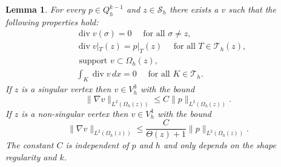 \documentclass[11pt]{amsart}
\numberwithin{equation}{section}
\newcommand{\Sh}{\mathcal{S}_h}
\newcommand{\dive}{\operatorname{div}}
\newcommand{\Th}{\mathcal{T}_h}
\newtheorem{lemma}{Lemma}
\theoremstyle{definition}
\begin{document}
\begin{lemma}\label{lemma0}
For every $p \in Q_h^{k-1}$ and $z \in \Sh$ there exists  a $v$ such that
the following properties hold:
\begin{subequations}\label{lemmavertex}
\begin{alignat}{1}
&\dive v (\sigma)= 0 \quad \text{ for all } \sigma \neq z,  \label{lemmavertex1} \\
& \dive v|_T (z)= p|_T(z) \quad \text{ for all } T \in \Th(z), \label{lemmavertex2} \\
& \text{ support } v \subset  \Omega_h(z),  \label{lemmavertex3} \\
& \int_K \dive v \, dx=0 \quad \text{ for all } K \in \Th. \label{lemmavertex4}
\end{alignat}
\end{subequations}
If $z$ is a singular vertex then $v \in V_h^3$ 
with the bound
\begin{equation}\label{lemmavertex5}
 \|\nabla v \|_{L^2(\Omega_h(z))} \le C \|p\|_{L^2(\Omega_h(z))}.
\end{equation}
If $z$ is a non-singular vertex then $v \in V_h^4$ 
with the bound
\begin{equation}\label{lemmavertex6}
 \|\nabla v \|_{L^2(\Omega_h(z))} \le \frac{C}{\Theta(z)+1} \|p\|_{L^2(\Omega_h(z))}.
\end{equation}
The constant $C$ is independent of $p$ and  $h$ and only depends on the shape regularity and $k$.

\end{lemma}
\end{document}
